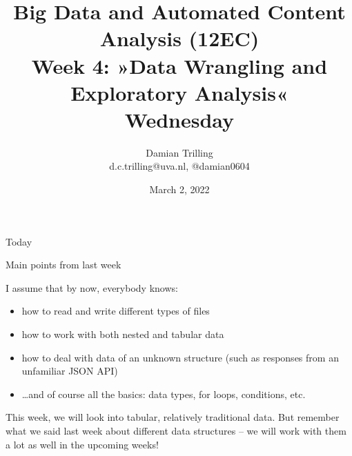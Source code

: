 

\graphicspath{{../../resources/img/}}




\title[Big Data and Automated Content Analysis]{\textbf{Big Data and Automated Content Analysis (12EC)} 
\\Week 4: »Data Wrangling and Exploratory Analysis«
\\Wednesday}
\author[Damian Trilling]{Damian Trilling\\ \footnotesize{d.c.trilling@uva.nl, @damian0604 \\}}
\date{March 2, 2022}


\begin{frame}{}
	\titlepage
\end{frame}

\begin{frame}{Today}
	\tableofcontents
\end{frame}





\begin{frame}{Main points from last week}

\begin{alertblock}{I assume that by now, everybody knows:}
\begin{itemize}
\item how to read and write different types of files
\item how to work with both nested and tabular data
\item how to deal with data of an unknown structure (such as responses from an unfamiliar JSON API)
\item \ldots and of course all the basics: data types, for loops, conditions, etc.
\end{itemize}
\end{alertblock}
\end{frame}


\begin{frame}[standout]
This week, we will look into tabular, relatively traditional data. But remember what we said last week about different data structures -- we will work with them a lot as well in the upcoming weeks!
\end{frame}












